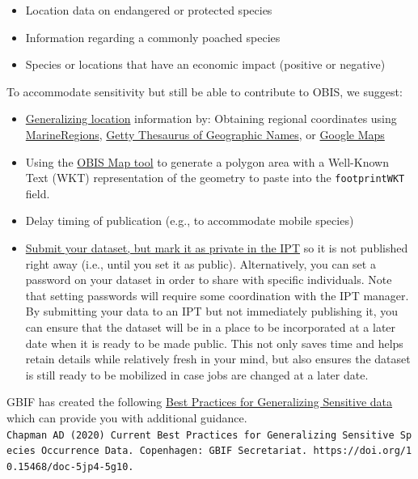\documentclass[
  letterpaper,
  DIV=11,
  numbers=noendperiod,
  oneside]{scrreprt}
\providecommand{\tightlist}{%
  \setlength{\itemsep}{0pt}\setlength{\parskip}{0pt}}\usepackage{longtable,booktabs,array}
\begin{document}
\begin{itemize}
\tightlist
\item
  Location data on endangered or protected species
\item
  Information regarding a commonly poached species
\item
  Species or locations that have an economic impact (positive or
  negative)
\end{itemize}

To accommodate sensitivity but still be able to contribute to OBIS, we
suggest:

\begin{itemize}
\tightlist
\item
  \protect\hyperlink{uncertain-geolocation}{Generalizing location}
  information by: Obtaining regional coordinates using
  \href{http://www.marineregions.org/gazetteer.php?p=search}{MarineRegions},
  \href{http://www.getty.edu/research/tools/vocabularies/tgn/}{Getty
  Thesaurus of Geographic Names}, or
  \href{http://maps.google.com/}{Google Maps}
\item
  Using the \href{https://obis.org/maptool/}{OBIS Map tool} to generate
  a polygon area with a Well-Known Text (WKT) representation of the
  geometry to paste into the \texttt{footprintWKT} field.
\item
  Delay timing of publication (e.g., to accommodate mobile species)
\item
  \href{ipt.html}{Submit your dataset, but mark it as private in the
  IPT} so it is not published right away (i.e., until you set it as
  public). Alternatively, you can set a password on your dataset in
  order to share with specific individuals. Note that setting passwords
  will require some coordination with the IPT manager. By submitting
  your data to an IPT but not immediately publishing it, you can ensure
  that the dataset will be in a place to be incorporated at a later date
  when it is ready to be made public. This not only saves time and helps
  retain details while relatively fresh in your mind, but also ensures
  the dataset is still ready to be mobilized in case jobs are changed at
  a later date.
\end{itemize}

GBIF has created the following
\href{https://docs.gbif.org/sensitive-species-best-practices/master/en/}{Best
Practices for Generalizing Sensitive data} which can provide you with
additional guidance.
\texttt{Chapman\ AD\ (2020)\ Current\ Best\ Practices\ for\ Generalizing\ Sensitive\ Species\ Occurrence\ Data.\ Copenhagen:\ GBIF\ Secretariat.\ https://doi.org/10.15468/doc-5jp4-5g10.}
\end{document}
